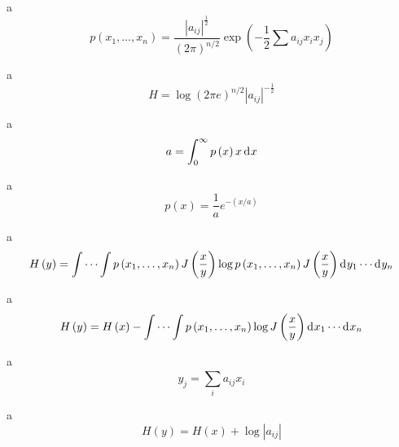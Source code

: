 a\\

\begin{equation}
p\left ( x_{1}, \ldots ,x_{n} \right )=\frac{\left | a_{ij} \right |^{\frac{1}{2}}}{\left ( 2\pi  \right )^{n/2}}\exp \left ( -\frac{1}{2} \sum a_{ij}x_{i}x_{j} \right)
\end{equation}

a\\

\begin{equation}
H=\log \left ( 2\pi e \right )^{n/2}\left | a_{ij} \right |^{-\frac{1}{2}}
\end{equation}

a\\

\begin{equation}
a=\int_{0}^{\infty}p\left ( x \right )x \diff x 
\end{equation}

a\\

\begin{equation}
p\left ( x \right )=\frac{1}{a}e^{-\left ( x/a \right )}
\end{equation}

a\\

\begin{equation}
H\left ( y \right )=\int \cdots \int p\left ( x_{1}, \ldots ,x_{n} \right )J\left ( \frac{x}{y} \right )\log p\left ( x_{1}, \ldots ,x_{n} \right )J\left ( \frac{x}{y} \right ) \diff y _{1}\cdots  \diff y _{n}
\end{equation}

a\\

\begin{equation}
H\left ( y \right )=H\left ( x \right )-\int \cdots \int p\left ( x_{1}, \ldots ,x_{n} \right )\log J \left ( \frac{x}{y} \right ) \diff x _{1}\cdots  \diff x _{n}
\end{equation}

a\\

\begin{equation}
y_{j}=\sum_{i}^{\:}a_{ij}x_{i}
\end{equation}

a\\

\begin{equation}
H\left ( y \right )=H\left ( x \right )+\log\left | a_{ij} \right |
\end{equation}

